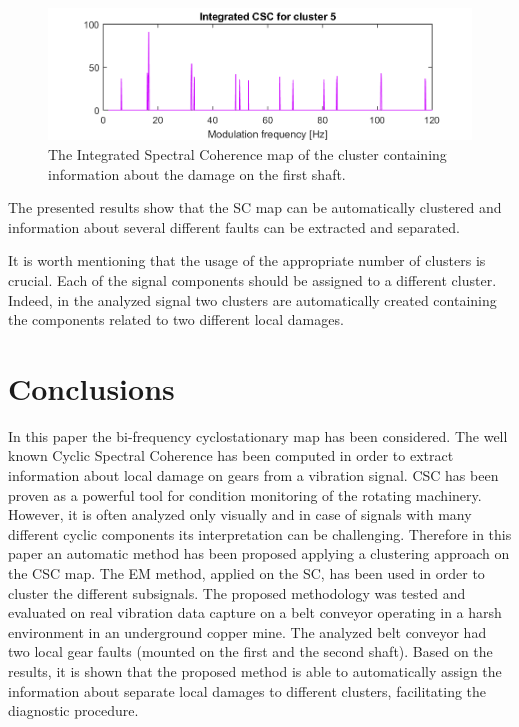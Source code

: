 \documentclass[11pt]{article}
\begin{document}
\begin{figure}[h!]
\begin{center}
\includegraphics[width=\textwidth]{wykresy/212_cluster_sum_5.png}
\caption{The Integrated Spectral Coherence map of the cluster containing information about the damage on the first shaft.}
\label{fig:intSC5}
\end{center}
\end{figure}

The presented results show that the SC map can be automatically clustered and information about several different faults can be extracted and separated.

 It is worth mentioning that the usage of the appropriate number of clusters is crucial. Each of the signal components should be assigned to a different cluster. Indeed, in the analyzed signal two clusters are automatically created containing the components related to two different local damages. 
\newpage
\section{Conclusions}
In this paper the bi-frequency cyclostationary map has been considered. The well known Cyclic Spectral Coherence has been computed in order to extract information about local damage on gears from a vibration signal. CSC has been proven as a powerful tool for condition monitoring of the rotating machinery. However, it is often analyzed only visually and in case of signals with many different cyclic components its interpretation can be challenging. Therefore in this paper an automatic method has been proposed applying a clustering approach on the CSC map. The EM method, applied on the SC, has been used in order to cluster the different subsignals. The proposed methodology was tested and evaluated on real vibration data capture on a belt conveyor operating in a harsh environment in an underground copper mine. The analyzed belt conveyor had two local gear faults (mounted on the first and the second shaft). Based on the results, it is shown that the proposed method is able to automatically assign the information about separate local damages to different clusters, facilitating the diagnostic procedure. 
\end{document}
